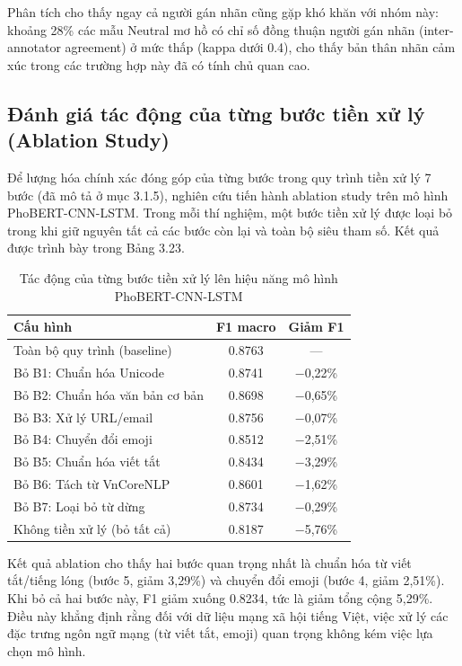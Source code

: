 \documentclass[14pt, a4paper]{report}
\begin{document}
Phân tích cho thấy ngay cả người gán nhãn cũng gặp khó khăn với nhóm này: khoảng 28\% các mẫu Neutral mơ hồ có chỉ số đồng thuận người gán nhãn (inter-annotator agreement) ở mức thấp (kappa dưới 0.4), cho thấy bản thân nhãn cảm xúc trong các trường hợp này đã có tính chủ quan cao.


\subsection{Đánh giá tác động của từng bước tiền xử lý (Ablation Study)}


Để lượng hóa chính xác đóng góp của từng bước trong quy trình tiền xử lý 7 bước (đã mô tả ở mục 3.1.5), nghiên cứu tiến hành ablation study trên mô hình PhoBERT-CNN-LSTM. Trong mỗi thí nghiệm, một bước tiền xử lý được loại bỏ trong khi giữ nguyên tất cả các bước còn lại và toàn bộ siêu tham số. Kết quả được trình bày trong Bảng 3.23.


\begin{table}[h]
\centering
\caption[Tác động từng bước tiền xử lý lên hiệu năng mô hình]{Tác động của từng bước tiền xử lý lên hiệu năng mô hình PhoBERT-CNN-LSTM}
\begin{tabular}{|l|c|c|}
\hline
\textbf{Cấu hình} & \textbf{F1 macro} & \textbf{Giảm F1} \\
\hline
Toàn bộ quy trình (baseline) & 0.8763 & — \\
\hline
Bỏ B1: Chuẩn hóa Unicode & 0.8741 & −0,22\% \\
\hline
Bỏ B2: Chuẩn hóa văn bản cơ bản & 0.8698 & −0,65\% \\
\hline
Bỏ B3: Xử lý URL/email & 0.8756 & −0,07\% \\
\hline
Bỏ B4: Chuyển đổi emoji & 0.8512 & −2,51\% \\
\hline
Bỏ B5: Chuẩn hóa viết tắt & 0.8434 & −3,29\% \\
\hline
Bỏ B6: Tách từ VnCoreNLP & 0.8601 & −1,62\% \\
\hline
Bỏ B7: Loại bỏ từ dừng & 0.8734 & −0,29\% \\
\hline
Không tiền xử lý (bỏ tất cả) & 0.8187 & −5,76\% \\
\hline
\end{tabular}
\end{table}




Kết quả ablation cho thấy hai bước quan trọng nhất là chuẩn hóa từ viết tắt/tiếng lóng (bước 5, giảm 3,29\%) và chuyển đổi emoji (bước 4, giảm 2,51\%). Khi bỏ cả hai bước này, F1 giảm xuống 0.8234, tức là giảm tổng cộng 5,29\%. Điều này khẳng định rằng đối với dữ liệu mạng xã hội tiếng Việt, việc xử lý các đặc trưng ngôn ngữ mạng (từ viết tắt, emoji) quan trọng không kém việc lựa chọn mô hình.
\end{document}
